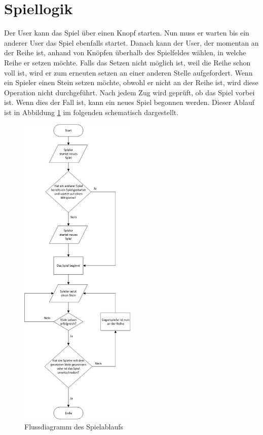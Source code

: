 \section{Spiellogik}\label{sec:Spiellogik}
Der User kann das Spiel über einen Knopf starten. Nun muss er warten bis ein anderer User das Spiel ebenfalls startet. Danach kann der User, der momentan an der Reihe ist, anhand von Knöpfen überhalb des Spielfeldes wählen, in welche Reihe er setzen möchte. Falls das Setzen nicht möglich ist, weil die Reihe schon voll ist, wird er zum erneuten setzen an einer anderen Stelle aufgefordert. Wenn ein Spieler einen Stein setzen möchte, obwohl er nicht an der Reihe ist, wird diese Operation nicht durchgeführt. Nach jedem Zug wird geprüft, ob das Spiel vorbei ist. Wenn dies der Fall ist, kann ein neues Spiel begonnen werden. Dieser Ablauf ist in Abbildung \ref{fig:spiellogik} im folgenden schematisch dargestellt.
\begin{figure}[H]
\centering
\includegraphics[width=0.5\textwidth]{images/spiellogik.jpg}
\caption{Flussdiagramm des Spielablaufs}
\label{fig:spiellogik}
\end{figure}

